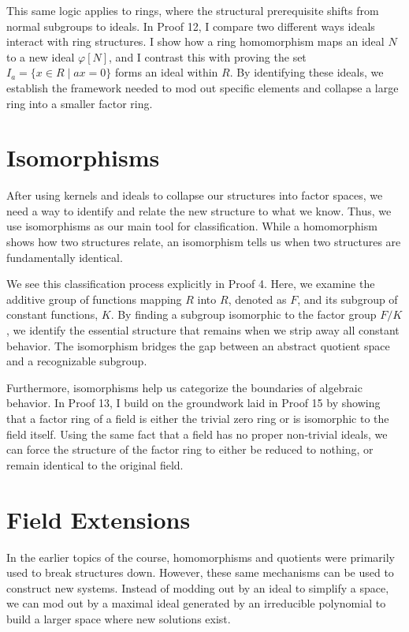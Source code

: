 This same logic applies to rings, where the structural prerequisite shifts from normal subgroups to ideals. In Proof 12, I compare two different ways ideals interact with ring structures. I show how a ring homomorphism maps an ideal \(N\) to a new ideal \(\varphi[N]\), and I contrast this with proving the set \(I_{a} = \{x \in R \mid ax = 0\}\) forms an ideal within \(R\). By identifying these ideals, we establish the framework needed to mod out specific elements and collapse a large ring into a smaller factor ring.


\section{Isomorphisms}

After using kernels and ideals to collapse our structures into factor spaces, we need a way to identify and relate the new structure to what we know. Thus, we use isomorphisms as our main tool for classification. While a homomorphism shows how two structures relate, an isomorphism tells us when two structures are fundamentally identical.

We see this classification process explicitly in Proof 4. Here, we examine the additive group of functions mapping \(R\) into \(R\), denoted as \(F\), and its subgroup of constant functions, \(K\). By finding a subgroup isomorphic to the factor group \(F/K\), we identify the essential structure that remains when we strip away all constant behavior. The isomorphism bridges the gap between an abstract quotient space and a recognizable subgroup.

Furthermore, isomorphisms help us categorize the boundaries of algebraic behavior. In Proof 13, I build on the groundwork laid in Proof 15 by showing that a factor ring of a field is either the trivial zero ring or is isomorphic to the field itself. Using the same fact that a field has no proper non-trivial ideals, we can force the structure of the factor ring to either be reduced to nothing, or remain identical to the original field.

\section{Field Extensions}

In the earlier topics of the course, homomorphisms and quotients were primarily used to break structures down. However, these same mechanisms can be used to construct new systems. Instead of modding out by an ideal to simplify a space, we can mod out by a maximal ideal generated by an irreducible polynomial to build a larger space where new solutions exist.

